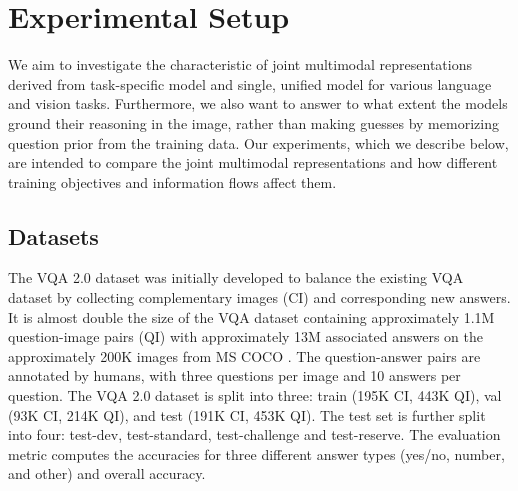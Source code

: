\documentclass{article}
\begin{document}
\section{Experimental Setup}
We aim to investigate the characteristic of joint multimodal representations derived from task-specific model and single, unified model for various language and vision tasks. Furthermore, we also want to answer to what extent the models ground their reasoning in the image, rather than making guesses by memorizing question prior from the training data. Our experiments, which we describe below, are intended to compare the joint multimodal representations and how different training objectives and information flows affect them.


\subsection{Datasets} \label{subsection:datasets}

The VQA 2.0 dataset \citep{goyal2017vqa2} was initially developed to balance the existing VQA dataset \citet{antol2015vqa} by collecting complementary images (CI) and corresponding new answers. It is almost double the size of the VQA dataset containing approximately 1.1M question-image pairs (QI) with approximately 13M associated answers on the approximately 200K images from MS COCO \citep{coco}. The question-answer pairs are annotated by humans, with three questions per image and 10 answers per question. The VQA 2.0 dataset is split into three: train (195K CI, 443K QI), val (93K CI, 214K QI), and test (191K CI, 453K QI). The test set is further split into four: test-dev, test-standard, test-challenge and test-reserve. The evaluation metric computes the accuracies for three different answer types (yes/no, number, and other) and overall accuracy.
\end{document}
